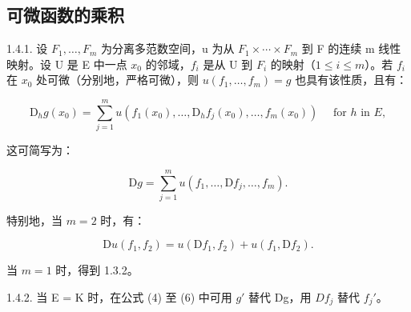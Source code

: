\subsection{可微函数的乘积}

1.4.1. 设 \(F_{1}, \ldots, F_{m}\) 为分离多范数空间，u 为从 \(F_{1} \times \cdots \times F_{m}\) 到 F 的连续 m 线性映射。设 U 是 E 中一点 \(x_{0}\) 的邻域，\(f_{i}\) 是从 U 到 \(F_{i}\) 的映射（\(1 \leqslant i \leqslant m\)）。若 \(f_{i}\) 在 \(x_{0}\) 处可微（分别地，严格可微），则 \(u(f_{1}, \ldots, f_{m}) = g\) 也具有该性质，且有：

\[
\mathrm{D} _ {h} g (x _ {0}) = \sum_ {j = 1} ^ {m} u (f _ {1} (x _ {0}), \dots , \mathrm{D} _ {h} f _ {j} (x _ {0}), \dots , f _ {m} (x _ {0})) \quad \text { for } h \text { in } E, \tag {4}
\]

这可简写为：

\[
\mathrm{D} g = \sum_ {j = 1} ^ {m} u (f _ {1}, \dots , \mathrm{D} f _ {j}, \dots , f _ {m}).\tag{5}
\]

特别地，当 \(m = 2\) 时，有：

\[
\mathrm{D} u (f _ {1}, f _ {2}) = u (\mathrm{D} f _ {1}, f _ {2}) + u (f _ {1}, \mathrm{D} f _ {2}).\tag{6}
\]

当 \(m = 1\) 时，得到 1.3.2。

1.4.2. 当 E = K 时，在公式 (4) 至 (6) 中可用 \(g'\) 替代 Dg，用 \(Df_{j}\) 替代 \(f_{j}'\)。

